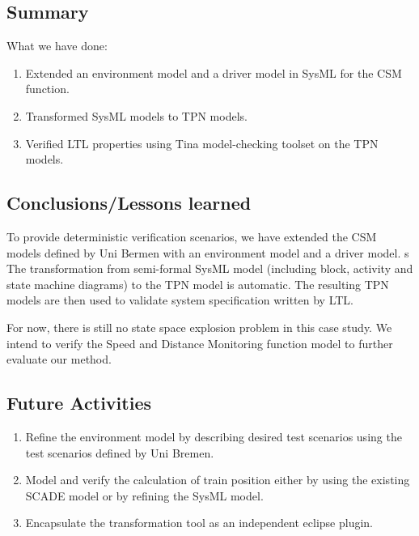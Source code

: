 \subsection{Summary}

What we have done:
\begin{enumerate}
\item Extended an environment model and a driver model in SysML for the CSM function.
\item Transformed SysML models to TPN models.
\item Verified LTL properties using Tina model-checking toolset on the TPN models.
\end{enumerate}

\subsection{Conclusions/Lessons learned}

To provide deterministic verification scenarios, we have extended the CSM models defined by Uni Bermen with an environment model and a driver model. s
The transformation from semi-formal SysML model (including block, activity and state machine diagrams) to the TPN model is automatic. The resulting TPN models are then used to validate system specification written by LTL. 

For now, there is still no state space explosion problem in this case study. We intend to verify the Speed and Distance Monitoring function model to further evaluate our method. 

\subsection{Future Activities}
 \begin{enumerate}
 \item Refine the environment model by describing desired test scenarios using the test scenarios defined by Uni Bremen. 
 \item Model and verify the calculation of train position either by using the existing SCADE model or by refining the SysML model.
 \item Encapsulate the transformation tool as an independent eclipse plugin. 
 \end{enumerate}

%
%

